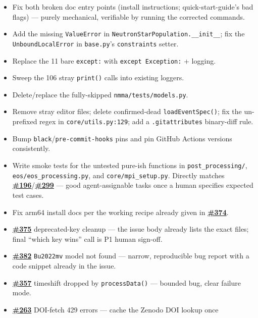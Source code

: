 \documentclass[10pt]{article}
\newcommand{\code}[1]{\texttt{#1}}
\begin{document}
\begin{itemize}
\item Fix both broken doc entry points (install instructions; quick-start-guide's
  bad flags) --- purely mechanical, verifiable by running the corrected commands.
\item Add the missing \code{ValueError} in
  \code{NeutronStarPopulation.\_\_init\_\_}; fix the \code{UnboundLocalError} in
  \code{base.py}'s \code{constraints} setter.
\item Replace the 11 bare \code{except:} with \code{except Exception:} + logging.
\item Sweep the 106 stray \code{print()} calls into existing loggers.
\item Delete/replace the fully-skipped \code{nmma/tests/models.py}.
\item Remove stray editor files; delete confirmed-dead \code{loadEventSpec()}; fix
  the un-prefixed regex in \code{core/utils.py:129}; add a \code{.gitattributes}
  binary-diff rule.
\item Bump \code{black}/\code{pre-commit-hooks} pins and pin GitHub Actions
  versions consistently.
\item Write smoke tests for the untested pure-ish functions in
  \code{post\_processing/}, \code{eos/eos\_processing.py}, and
  \code{core/mpi\_setup.py}. Directly matches \textbf{\href{https://github.com/nuclear-multimessenger-astronomy/nmma/issues/196}{\#196}}/\textbf{\href{https://github.com/nuclear-multimessenger-astronomy/nmma/issues/299}{\#299}} ---
  good agent-assignable tasks once a human specifies expected test cases.
\item Fix arm64 install docs per the working recipe already given in
  \textbf{\href{https://github.com/nuclear-multimessenger-astronomy/nmma/issues/374}{\#374}}.
\item \textbf{\href{https://github.com/nuclear-multimessenger-astronomy/nmma/issues/375}{\#375}} deprecated-key cleanup --- the issue body already lists the
  exact files; final ``which key wins'' call is P1 human sign-off.
\item \textbf{\href{https://github.com/nuclear-multimessenger-astronomy/nmma/issues/382}{\#382}} \code{Bu2022mv} model not found --- narrow, reproducible bug
  report with a code snippet already in the issue.
\item \textbf{\href{https://github.com/nuclear-multimessenger-astronomy/nmma/issues/357}{\#357}} timeshift dropped by \code{processData()} --- bounded bug,
  clear failure mode.
\item \textbf{\href{https://github.com/nuclear-multimessenger-astronomy/nmma/issues/263}{\#263}} DOI-fetch 429 errors --- cache the Zenodo DOI lookup once

\end{itemize}
\end{document}

